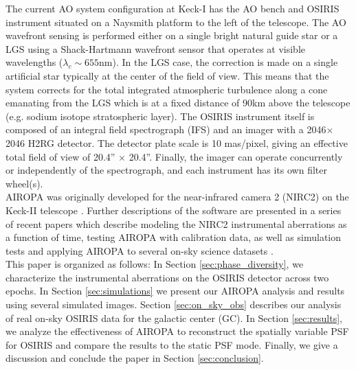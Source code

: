 \documentclass[]{spie}  %
\begin{document}
\indent The current AO system configuration at Keck-I has the AO bench and OSIRIS instrument situated on a Naysmith platform to the left of the telescope. The AO wavefront sensing is performed either on a single bright natural guide star or a LGS using a Shack-Hartmann wavefront sensor that operates at visible wavelengths ($\lambda_c {\sim}655$nm). In the LGS case, the correction is made on a single artificial star typically at the center of the field of view. This means that the system corrects for the total integrated atmospheric turbulence \cite{wizinowich:2006a} along a cone emanating from the LGS which is at a fixed distance of 90km above the telescope (e.g. sodium isotope stratospheric layer). The OSIRIS instrument itself is composed of an integral field spectrograph (IFS) and an imager with a 2046$\times$2046 H2RG detector. The detector plate scale is 10 mas/pixel, giving an effective total field of view of 20.4'' $\times$ 20.4''. Finally, the imager can operate concurrently or independently of the spectrograph, and each instrument has its own filter wheel(s).\\
\indent AIROPA was originally developed for the near-infrared camera 2 (NIRC2) on the Keck-II telescope \citep{witzel:2016a}. Further descriptions of the software are presented in a series of recent papers which describe modeling the NIRC2 instrumental aberrations as a function of time, testing AIROPA with calibration data, as well as simulation tests and applying AIROPA to several on-sky science datasets \citep{ciurlo:2022a, turri:2022, terry:2023a}. \\
\indent This paper is organized as follows: In Section \ref{sec:phase_diversity}, we characterize the instrumental aberrations on the OSIRIS detector across two epochs. In Section \ref{sec:simulations} we present our AIROPA analysis and results using several simulated images. Section \ref{sec:on_sky_obs} describes our analysis of real on-sky OSIRIS data for the galactic center (GC). In Section \ref{sec:results}, we analyze the effectiveness of AIROPA to reconstruct the spatially variable PSF for OSIRIS and compare the results to the static PSF mode. Finally, we give a discussion and conclude the paper in Section \ref{sec:conclusion}.
\end{document}
